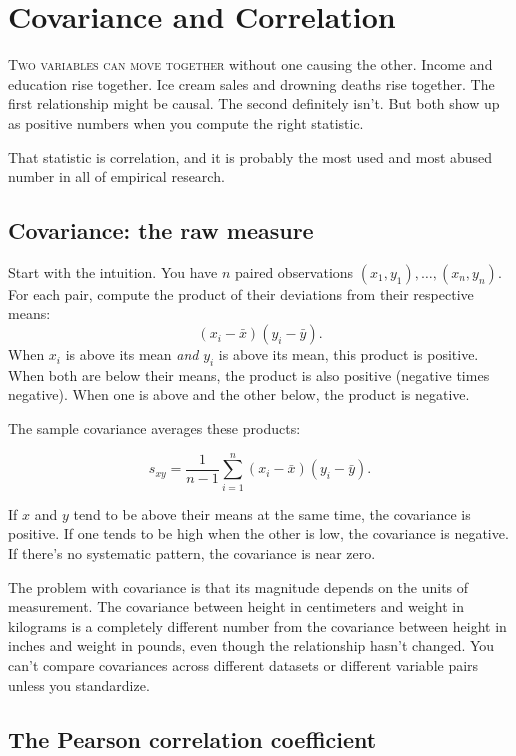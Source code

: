 \chapter{Covariance and Correlation}
\label{ch:correlation}

\noindent\textsc{Two variables can move together} without one causing the other. Income and education rise together. Ice cream sales and drowning deaths rise together. The first relationship might be causal. The second definitely isn't. But both show up as positive numbers when you compute the right statistic.

That statistic is correlation, and it is probably the most used and most abused number in all of empirical research.

\section{Covariance: the raw measure}

Start with the intuition. You have $n$ paired observations $(x_1, y_1), \ldots, (x_n, y_n)$. For each pair, compute the product of their deviations from their respective means:
\[
  (x_i - \bar{x})(y_i - \bar{y}).
\]
When $x_i$ is above its mean \emph{and} $y_i$ is above its mean, this product is positive. When both are below their means, the product is also positive (negative times negative). When one is above and the other below, the product is negative.

The sample covariance averages these products:

\begin{equation}
\boxed{s_{xy} = \frac{1}{n-1}\sum_{i=1}^{n}(x_i - \bar{x})(y_i - \bar{y}).}
\label{eq:sample-cov}
\end{equation}

If $x$ and $y$ tend to be above their means at the same time, the covariance is positive. If one tends to be high when the other is low, the covariance is negative. If there's no systematic pattern, the covariance is near zero.

The problem with covariance is that its magnitude depends on the units of measurement. The covariance between height in centimeters and weight in kilograms is a completely different number from the covariance between height in inches and weight in pounds, even though the relationship hasn't changed. You can't compare covariances across different datasets or different variable pairs unless you standardize.

\section{The Pearson correlation coefficient}

